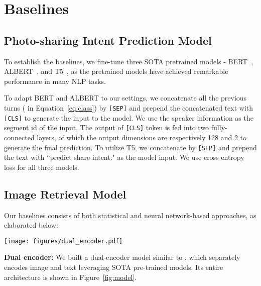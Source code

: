 \documentclass[11pt,a4paper]{article}
\begin{document}
\section{Baselines}
\subsection{Photo-sharing Intent Prediction Model}
To establish the baselines, we fine-tune three SOTA pretrained models - BERT~\citep{jacob2018bert}, ALBERT~\citep{lan2020albert}, and T5~\citep{2020t5}, as the pretrained models have achieved remarkable performance in many NLP tasks.

To adapt BERT and ALBERT to our settings, we concatenate all the previous turns ( in Equation~\ref{eq:class}) by \texttt{[SEP]} and prepend the concatenated text with \texttt{[CLS]} to generate the input to the model. We use the speaker information  as the segment id of the input. The output of \texttt{[CLS]} token is fed into two fully-connected layers, of which the output dimensions are respectively 128 and 2 to generate the final prediction. To utilize T5, we concatenate  by \texttt{[SEP]} and prepend the text with ``predict share intent:" as the model input. We use cross entropy loss for all three models.




\subsection{Image Retrieval Model}
Our baselines consists of both statistical and neural network-based approaches, as elaborated below:
\begin{figure*}[t]
  \centering
  \texttt{[image: figures/dual\_encoder.pdf]}
    \setlength{\abovecaptionskip}{-10pt}
  \caption{Our dual encoder. The first dialogue in Figure~\ref{fig:data_ex} is used as the input example. Image and text are encoded separately to generate their embeddings. The dot product of them is then used to compute the similarity score.}
  \label{fig:model}
  \setlength{\belowcaptionskip}{-20pt}
  \vspace{-5mm}
\end{figure*}

\textbf{Dual encoder:}
We built a dual-encoder model similar to \citet{parekh2020crisscrossed, gillick2018endtoend}, which separately encodes image and text leveraging SOTA pre-trained models. Its entire architecture is shown in Figure~\ref{fig:model}.
\end{document}
